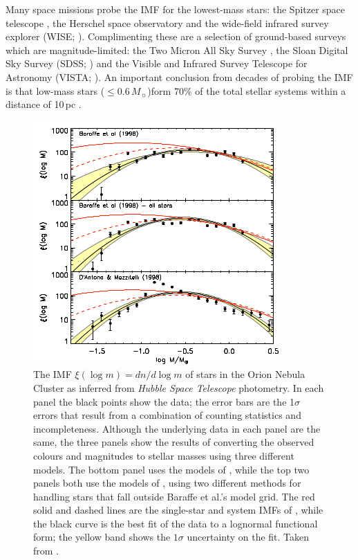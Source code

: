 Many space missions probe the IMF for the lowest-mass stars: the Spitzer space telescope \citep{2004ApJS..154....1W}, the Herschel space observatory \citep{2010A&A...518L...1P} and the wide-field infrared survey explorer (WISE; \citealt{2010AJ....140.1868W}). 
Complimenting these are a selection of ground-based surveys which are magnitude-limited: the Two Micron All Sky Survey \citep{2006AJ....131.1163S}, the Sloan Digital Sky Survey (SDSS; \citealt{2000AJ....120.1579Y}) and the Visible and Infrared Survey Telescope for Astronomy (VISTA; \citealt{2001ASPC..232..339E}). An important conclusion from decades of probing the IMF is that low-mass stars ($\leq 0.6\,M_\sun$)form 70\% of the total stellar systems within a distance of 10\,pc \citep{2006AJ....132.2360H}.  


\begin{figure}
    \centering
    \includegraphics{3-images/IMF.png}
    \caption{The IMF $\xi(\log m) = dn/d\log m$ of stars in the Orion Nebula Cluster as inferred from \textit{Hubble Space Telescope} photometry. In each panel the black points show the data; the error bars are the 1$\sigma$ errors that result from a combination of counting statistics and incompleteness. Although the underlying data in each panel are the same, the three panels show the results of converting the observed colours and magnitudes to stellar masses using three different models. The bottom panel uses the models of \citet{1998ASPC..134..442D}, while the top two panels both use the models of \citet{1998A&A...337..403B}, using two different methods for handling stars that fall outside Baraffe et al.'s model grid. The red solid and dashed lines are the single-star and system IMFs of \citet{2003PASP..115..763C}, while the black curve is the best fit of the data to a lognormal functional form; the yellow band shows the $1\sigma$ uncertainty on the fit. Taken from  \citet{2012ApJ...748...14D}. }
    \label{fig:IMF_late_stars}
\end{figure}


